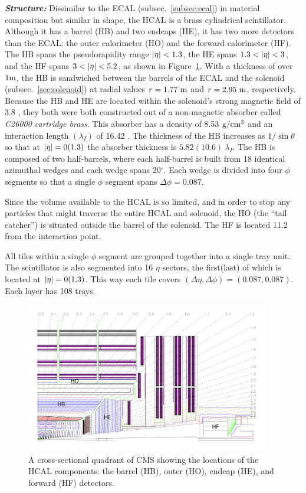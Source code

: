 \textit{\textbf{Structure:}}
Dissimilar to the ECAL (subsec.~\ref{subsec:ecal}) in material composition but similar in shape, the HCAL is a brass cylindrical scintillator.
Although it has a barrel (HB) and two endcaps (HE), it has two more detectors than the ECAL: the outer calorimeter (HO) and the forward calorimeter (HF).
The HB spans the pseudorapidity range $\abseta < 1.3$, the HE spans $1.3 < \abseta < 3$, and the HF spans $3 < \abseta < 5.2$, as shown in Figure~\ref{fig:hcal_quadrant}.
With a thickness of over $1\meter$, the HB is sandwiched between the barrels of the ECAL and the solenoid (subsec.~\ref{sec:solenoid}) at radial values $r = 1.77~\meter$ and $r = 2.95~\meter$, respectively.
Because the HB and HE are located within the solenoid's strong magnetic field of 3.8 \tesla, they both were both constructed out of a non-magnetic absorber called \emph{C26000 cartridge brass}.
This absorber has a density of 8.53 $\gram/\cm^{3}$ and an interaction length $(\lambda_I)$ of 16.42 \cm.
The thickness of the HB increases as $1/\sin{\theta}$ so that at $\abseta = 0(1.3)$ the absorber thickness is $5.82(10.6)~\lambda_I$.
The HB is composed of two half-barrels, where each half-barrel is built from 18 identical azimuthal wedges and each wedge spans 20$^\circ$.
Each wedge is divided into four $\phi$ segments so that a single $\phi$ segment spans $\Delta \phi = 0.087$.

Since the volume available to the HCAL is so limited, and in order to stop any particles that might traverse the entire HCAL and solenoid, the HO (the ``tail catcher'') is situated outside the barrel of the solenoid.
The HF is located 11.2 \meter from the interaction point.

All tiles within a single $\phi$ segment are grouped together into a single tray unit.
The scintillator is also segmented into 16 $\eta$ sectors, the first(last) of which is located at $\abseta = 0(1.3)$.
This way each tile covers $(\Delta \eta, \Delta \phi) = (0.087, 0.087)$.
Each layer has 108 trays.

\begin{figure}[pbth]
    \centering
    \includegraphics[width=0.95\textwidth]{figures/cms/hcal/hcal_quadrants_longitudinalview.jpg}
    \caption{
        A cross-sectional quadrant of CMS showing the locations of the HCAL components:
        the barrel (HB), outer (HO), endcap (HE), and forward (HF) detectors.
        }
    \label{fig:hcal_quadrant}
\end{figure}

